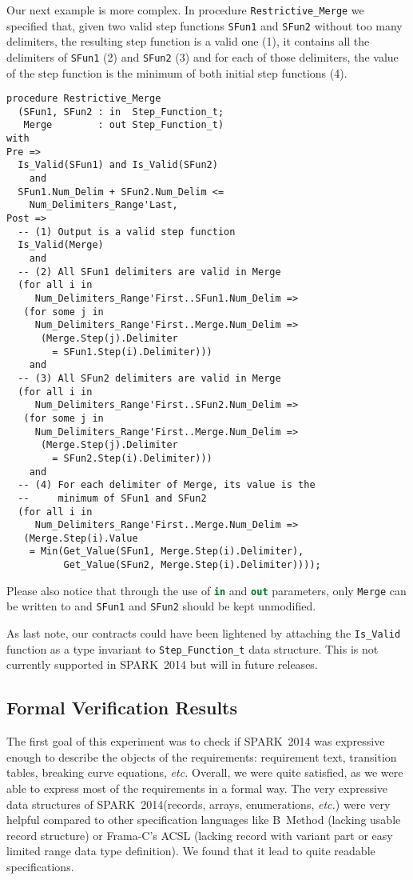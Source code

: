 \documentclass[10pt,a4paper,twocolumn]{article}
\newcommand{\newspark}{SPARK~2014\xspace}
\newcommand{\etc}{\textit{etc.}\xspace}
\newcommand{\SPARK}[1]{\lstinline[language=Ada,basicstyle={\footnotesize
      \sffamily},framesep=0pt]$#1$}
\begin{document}
Our next example is more complex.
In procedure \SPARK{Restrictive_Merge} we specified that, given two
valid step functions \SPARK{SFun1} and
\SPARK{SFun2} without too many delimiters, the resulting step function is a
valid one (1), it contains all the delimiters of \SPARK{SFun1} (2) and
\SPARK{SFun2} (3) and for each of those delimiters, the value of the step
function is the minimum of both initial step functions (4).

\begin{lstlisting}
procedure Restrictive_Merge
  (SFun1, SFun2 : in  Step_Function_t;
   Merge        : out Step_Function_t)
with
Pre =>
  Is_Valid(SFun1) and Is_Valid(SFun2)
    and
  SFun1.Num_Delim + SFun2.Num_Delim <=
    Num_Delimiters_Range'Last,
Post =>
  -- (1) Output is a valid step function
  Is_Valid(Merge)
    and
  -- (2) All SFun1 delimiters are valid in Merge
  (for all i in
     Num_Delimiters_Range'First..SFun1.Num_Delim =>
   (for some j in
     Num_Delimiters_Range'First..Merge.Num_Delim =>
      (Merge.Step(j).Delimiter
        = SFun1.Step(i).Delimiter)))
    and
  -- (3) All SFun2 delimiters are valid in Merge
  (for all i in
     Num_Delimiters_Range'First..SFun2.Num_Delim =>
   (for some j in
     Num_Delimiters_Range'First..Merge.Num_Delim =>
      (Merge.Step(j).Delimiter
        = SFun2.Step(i).Delimiter)))
    and
  -- (4) For each delimiter of Merge, its value is the
  --     minimum of SFun1 and SFun2
  (for all i in
     Num_Delimiters_Range'First..Merge.Num_Delim =>
   (Merge.Step(i).Value
    = Min(Get_Value(SFun1, Merge.Step(i).Delimiter),
          Get_Value(SFun2, Merge.Step(i).Delimiter))));
\end{lstlisting}

Please also notice that through the use of \SPARK{in} and \SPARK{out}
parameters, only \SPARK{Merge} can be written to and \SPARK{SFun1} and
\SPARK{SFun2} should be kept unmodified.

As last note, our contracts could have been lightened by attaching the
\SPARK{Is_Valid} function as a type invariant to
\SPARK{Step_Function_t} data structure. This is not currently
supported in \newspark but will in future releases.

\subsection{Formal Verification Results}

The first goal of this experiment was to check if \newspark was
expressive enough to describe the objects of the requirements:
requirement text, transition tables, breaking curve equations, \etc
Overall, we were quite satisfied, as we were able to express most of
the requirements in a formal way. The very expressive data structures
of \newspark (records, arrays, enumerations, \etc) were very helpful
compared to other specification languages like B~Method\cite{b-book}
(lacking usable record structure) or Frama-C's ACSL\cite{acsl}
(lacking record with variant part or easy limited range data type
definition). We found that it lead to quite readable specifications.
\end{document}
